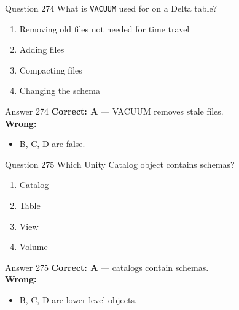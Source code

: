 \documentclass[aspectratio=169,11pt]{beamer}
\begin{document}
	\begin{frame}{Question 274}
		What is \texttt{VACUUM} used for on a Delta table?
		\begin{enumerate}[label=\Alph*.]
			\item Removing old files not needed for time travel
			\item Adding files
			\item Compacting files
			\item Changing the schema
		\end{enumerate}
	\end{frame}
	\begin{frame}{Answer 274}
		\textbf{Correct: A} --- VACUUM removes stale files.\\
		\vspace{0.5em}
		\textbf{Wrong:}
		\begin{itemize}
			\item B, C, D are false.
		\end{itemize}
	\end{frame}
	
	\begin{frame}{Question 275}
		Which Unity Catalog object contains schemas?
		\begin{enumerate}[label=\Alph*.]
			\item Catalog
			\item Table
			\item View
			\item Volume
		\end{enumerate}
	\end{frame}
	\begin{frame}{Answer 275}
		\textbf{Correct: A} --- catalogs contain schemas.\\
		\vspace{0.5em}
		\textbf{Wrong:}
		\begin{itemize}
			\item B, C, D are lower-level objects.
		\end{itemize}
	\end{frame}
	
\end{document}
